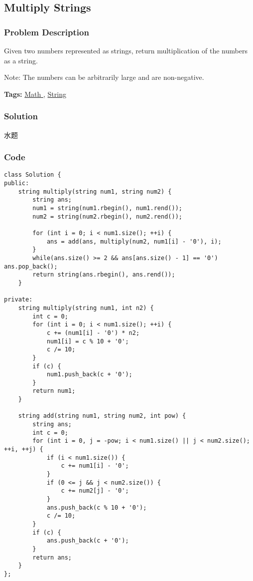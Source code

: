 \documentclass{article}
\begin{document}
\begin{CJK*}{UTF8}{gkai}
\subsection{ Multiply Strings }
\label{ Multiply Strings }

\subsubsection*{Problem Description}
Given two numbers represented as strings, return multiplication of the numbers as a string.

Note: The numbers can be arbitrarily large and are non-negative.


\textbf{Tags: }
\hyperref[ Math ]{ Math },  \hyperref[ String ]{ String }



\subsubsection*{Solution}
水题

\subsubsection*{Code}
\begin{lstlisting}
class Solution {
public:
    string multiply(string num1, string num2) {
        string ans;
        num1 = string(num1.rbegin(), num1.rend());
        num2 = string(num2.rbegin(), num2.rend());
        
        for (int i = 0; i < num1.size(); ++i) {
            ans = add(ans, multiply(num2, num1[i] - '0'), i);
        }
        while(ans.size() >= 2 && ans[ans.size() - 1] == '0') ans.pop_back();
        return string(ans.rbegin(), ans.rend());
    }
    
private:
    string multiply(string num1, int n2) {
        int c = 0;
        for (int i = 0; i < num1.size(); ++i) {
            c += (num1[i] - '0') * n2;
            num1[i] = c % 10 + '0';
            c /= 10;
        }
        if (c) {
            num1.push_back(c + '0');
        }
        return num1;
    }
    
    string add(string num1, string num2, int pow) {
        string ans;
        int c = 0;
        for (int i = 0, j = -pow; i < num1.size() || j < num2.size(); ++i, ++j) {
            if (i < num1.size()) {
                c += num1[i] - '0';
            }
            if (0 <= j && j < num2.size()) {
                c += num2[j] - '0';
            }
            ans.push_back(c % 10 + '0');
            c /= 10;
        }
        if (c) {
            ans.push_back(c + '0');
        }
        return ans;
    }
};



\end{lstlisting}
\end{CJK*}
\end{document}
